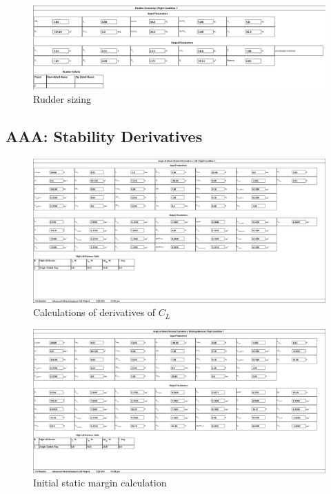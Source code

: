 \documentclass[conf]{new-aiaa}
\begin{document}
\begin{figure}[H]
    \includegraphics[width=\textwidth]{Report3Printouts/Empannage/Vertical_rudder_cropped.png}
    \caption{Rudder sizing}
    \label{fig:vertical_rudder}
\end{figure}

\subsection{AAA: Stability Derivatives}

\begin{figure}[H]
    \includegraphics[width=\textwidth]{Report3Printouts/Stability/CL_alpha.png}
    \caption{Calculations of derivatives of $C_L$}
    \label{fig:cl_alpha}
\end{figure}

\begin{figure}[H]
    \includegraphics[width=\textwidth]{Report3Printouts/Stability/CM_alpha.png}
    \caption{Initial static margin calculation}
    \label{fig:cm_alpha}
\end{figure}
\end{document}
